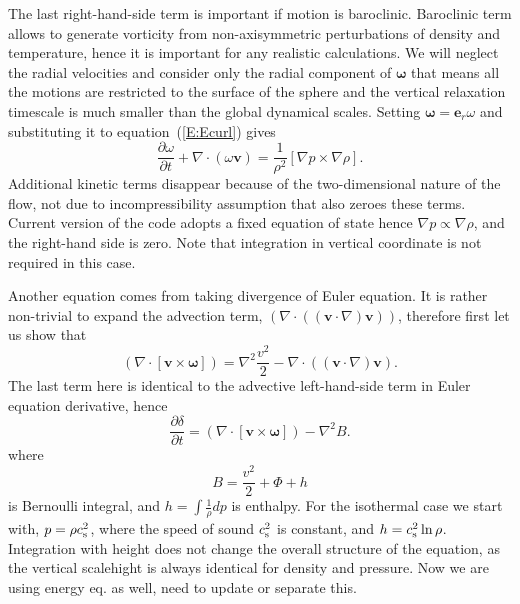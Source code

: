 \documentclass[usenatbib,onecolumn]{mnras}
\newcommand{\alert}[1]{\color{red} #1\color{black}}
\renewcommand{\vector}[1]{\ensuremath{\pmb{#1}}}
\newcommand{\pardir}[2]{\ensuremath{\frac{\partial #2}{\partial #1} }}
\begin{document}
The last right-hand-side term is important if motion is baroclinic. Baroclinic term
allows to generate vorticity from non-axisymmetric perturbations of density
and temperature, hence it is important for any realistic calculations. We will
neglect the radial velocities and consider only the radial component of
$\vector{\omega}$ that means all the motions are restricted to the surface of
the sphere and the vertical relaxation timescale is much smaller than the
global dynamical scales. Setting $\vector{\omega} = \vector{e}_r \omega$ and
substituting it to equation~(\ref{E:Ecurl}) gives
\begin{equation}\label{E:Ecurl:r}
\displaystyle  \pardir{t}{\omega} + \nabla \cdot (\omega \vector{v}) =
\frac{1}{\rho^2}\left[\nabla p \times \nabla \rho \right].
\end{equation}
Additional kinetic terms disappear because of the two-dimensional nature of
the flow, not due to incompressibility assumption that also zeroes these
terms. Current version of the code adopts a fixed equation of state hence
$\nabla p \propto \nabla \rho $, and the right-hand side is zero. Note that
integration in vertical coordinate is not required in this case. 

Another equation comes from taking divergence of Euler equation. It is rather
non-trivial to expand the advection term, $(\nabla \cdot
((\vector{v}\cdot \nabla)\vector{v}))$, therefore first let us show that
\begin{equation}\label{E:vomega}
\displaystyle \left(\nabla \cdot \left[ \vector{v} \times \vector{\omega}\right] \right) = 
 \nabla^2\frac{v^2}{2} - \nabla \cdot \left((\vector{v}\cdot \nabla)\vector{v}\right).
\end{equation}
The last term here is identical to the advective left-hand-side term in Euler
equation derivative, hence
\begin{equation}\label{E:delta}
\pardir{t}{\delta} = \left(\nabla \cdot \left[ \vector{v}\times 
  \vector{\omega}\right] \right) -  \nabla^2 B.
\end{equation}
where
\begin{equation}\label{E:Bernoulli}
B = \frac{v^2}{2} + \Phi + h
\end{equation}
is Bernoulli integral, and $\displaystyle h = \int \frac{1}{\rho}dp$ is enthalpy. For the
isothermal case we start with, $p =  \rho c_{\rm s}^2$, where the speed of
sound $c_{\rm s}^2$ is constant, and $h= c_{\rm s}^2 \ln\rho$. Integration
with height does not change the overall structure of the equation, as the
vertical scalehight is always identical for density and pressure. \alert{Now
  we are using energy eq. as well, need to update or separate this. }
\end{document}
